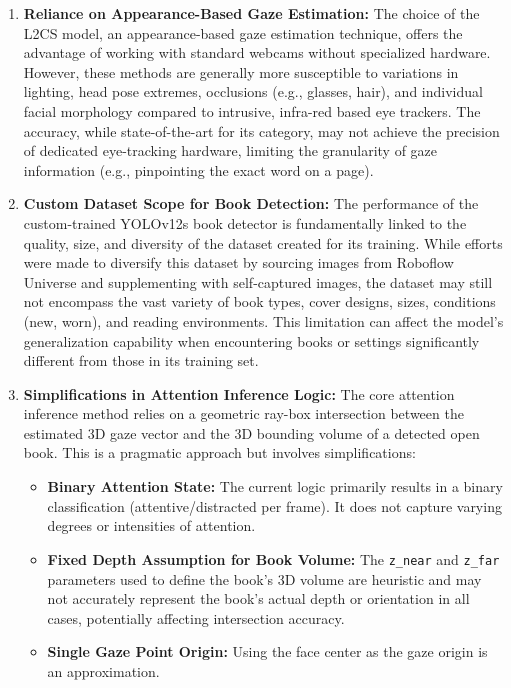 \begin{enumerate}
    \item \textbf{Reliance on Appearance-Based Gaze Estimation:}
    The choice of the L2CS model, an appearance-based gaze estimation technique, offers the advantage of working with standard webcams without specialized hardware. However, these methods are generally more susceptible to variations in lighting, head pose extremes, occlusions (e.g., glasses, hair), and individual facial morphology compared to intrusive, infra-red based eye trackers. The accuracy, while state-of-the-art for its category, may not achieve the precision of dedicated eye-tracking hardware, limiting the granularity of gaze information (e.g., pinpointing the exact word on a page).

    \item \textbf{Custom Dataset Scope for Book Detection:}
    The performance of the custom-trained YOLOv12s book detector is fundamentally linked to the quality, size, and diversity of the dataset created for its training. While efforts were made to diversify this dataset by sourcing images from Roboflow Universe and supplementing with self-captured images, the dataset may still not encompass the vast variety of book types, cover designs, sizes, conditions (new, worn), and reading environments. This limitation can affect the model's generalization capability when encountering books or settings significantly different from those in its training set.

    \item \textbf{Simplifications in Attention Inference Logic:}
    The core attention inference method relies on a geometric ray-box intersection between the estimated 3D gaze vector and the 3D bounding volume of a detected open book. This is a pragmatic approach but involves simplifications:
    \begin{itemize}
        \item \textbf{Binary Attention State:} The current logic primarily results in a binary classification (attentive/distracted per frame). It does not capture varying degrees or intensities of attention.
        \item \textbf{Fixed Depth Assumption for Book Volume:} The \texttt{z\_near} and \texttt{z\_far} parameters used to define the book's 3D volume are heuristic and may not accurately represent the book's actual depth or orientation in all cases, potentially affecting intersection accuracy.
        \item \textbf{Single Gaze Point Origin:} Using the face center as the gaze origin is an approximation.
    \end{itemize}


\end{enumerate}
